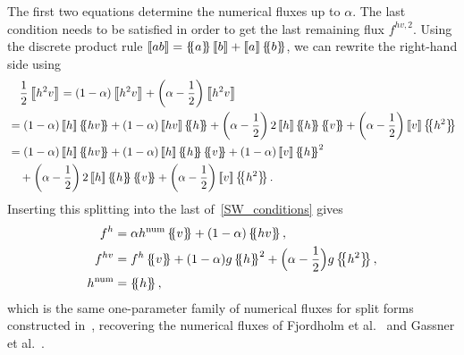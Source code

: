 \documentclass[]{scrartcl}
\newcommand*{\ldblbrace}{\{\mskip-5mu \left \{}
\newcommand*{\rdblbrace}{ \}\mskip-5mu \right \}}
\newcommand{\mean}[1]{\left\ldblbrace #1 \right\rdblbrace}
\newcommand{\jump}[1]{\left\llbracket #1  \right\rrbracket}
\theoremstyle{definition}
\begin{document}
The first two equations determine the numerical fluxes up to $\alpha$. The last condition needs to be satisfied in order to get the last remaining flux $f^{hv,2}$.
Using the discrete product rule $\jump{a b} = \mean{a}\jump{b} + \jump{a}\mean{b}$, we can rewrite the right-hand side using
\begin{equation}
\begin{aligned}
    &\quad
    \frac{1}{2}\jump{h^2 v}
    =
    (1-\alpha) \jump{h^2v} + \left(\alpha - \frac{1}{2}\right) \jump{h^2v}
    \\
    &= ( 1 - \alpha) \jump{h} \mean{hv} + (1 - \alpha) \jump{hv} \mean{h} + \left (\alpha - \frac{1}{2} \right ) 2 \jump{h}\mean{h} \mean{v}+ \left ( \alpha - \frac{1}{2} \right ) \jump{v} \mean{h^2}
    \\
    &= ( 1 - \alpha) \jump{h} \mean{hv} + (1 - \alpha) \jump{h} \mean{h} \mean{v} + (1-\alpha) \jump{v}\mean{h}^2
    \\
    &\quad
    + \left (\alpha - \frac{1}{2} \right ) 2 \jump{h}\mean{h} \mean{v}+ \left ( \alpha - \frac{1}{2} \right ) \jump{v} \mean{h^2}.
\end{aligned}
\end{equation}
Inserting this splitting into the last of~\eqref{SW_conditions} gives
\begin{equation}
\begin{aligned}
    f^h &= \alpha h^{\mathrm{num}} \mean{v} + (1-\alpha) \mean{hv}, \\
    f^{hv} &= f^h \mean{v} + (1-\alpha)g \mean{h}^2 + \Bigl (\alpha - \frac{1}{2} \Bigr ) g \mean{h^2},\\
    h^{\mathrm{num}} &= \mean{h},
\end{aligned}
\label{shallow_water_split}
\end{equation}
which is the same one-parameter family of numerical fluxes for split forms constructed in~\cite{Ranocha2017}, recovering the numerical fluxes of Fjordholm et al.~\cite{FJORDHOLM20115587} and Gassner et al.~\cite{gassner2016shallowwater}.

\end{document}
